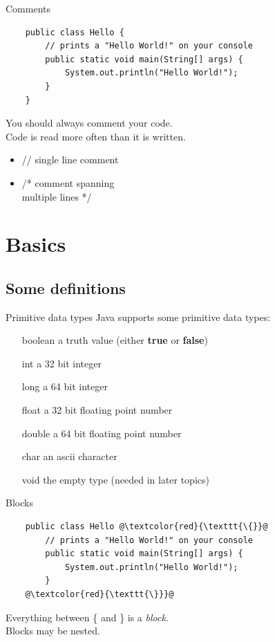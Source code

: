 \begin{frame}[fragile]{Comments}
	\begin{lstlisting}
	public class Hello {
	    // prints a "Hello World!" on your console
	    public static void main(String[] args) {
	        System.out.println("Hello World!");
	    }
	}
	\end{lstlisting}
	You should always comment your code. \\
	Code is read more often than it is written.
	\begin{itemize}
		\item // single line comment
		\item /* comment spanning \\
			multiple lines */
	\end{itemize}
\end{frame}

\section{Basics}
\subsection{Some definitions}

\begin{frame}{Primitive data types}
	Java supports some primitive data types:
	\begin{itemize}
		\item[boolean] a truth value (either \textbf{true} or \textbf{false})
		\item[int] a 32 bit integer
		\item[long] a 64 bit integer
		\item[float] a 32 bit floating point number
		\item[double] a 64 bit floating point number
		\item[char] an ascii character
		\item[void] the empty type (needed in later topics)
	\end{itemize}
\end{frame}

\begin{frame}[fragile]{Blocks}
	\begin{lstlisting}
	public class Hello @\textcolor{red}{\texttt{\{}}@
	    // prints a "Hello World!" on your console
	    public static void main(String[] args) {
	        System.out.println("Hello World!");
	    }
	@\textcolor{red}{\texttt{\}}}@
	\end{lstlisting}
	Everything between \{ and \} is a \emph{block}. \\
	Blocks may be nested.
\end{frame}


